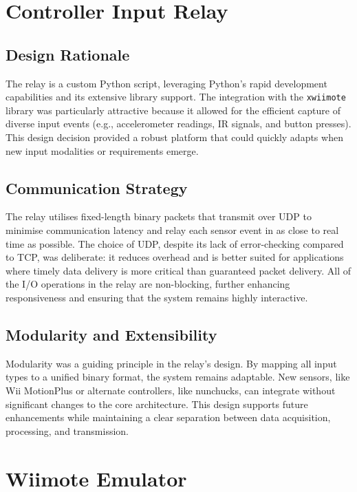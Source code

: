 \section{Controller Input Relay}

\subsection{Design Rationale}
The relay is a custom Python script, leveraging Python’s rapid development capabilities and its extensive library support. The integration with the \texttt{xwiimote} library was particularly attractive because it allowed for the efficient capture of diverse input events (e.g., accelerometer readings, IR signals, and button presses). This design decision provided a robust platform that could quickly adapts when new input modalities or requirements emerge.

\subsection{Communication Strategy}
The relay utilises fixed-length binary packets that transmit over UDP to minimise communication latency and relay each sensor event in as close to real time as possible. The choice of UDP, despite its lack of error-checking compared to TCP\cite{wikipediaTCP}, was deliberate: it reduces overhead and is better suited for applications where timely data delivery is more critical than guaranteed packet delivery. All of the I/O operations in the relay are non-blocking, further enhancing responsiveness and ensuring that the system remains highly interactive.

\subsection{Modularity and Extensibility}
Modularity was a guiding principle in the relay’s design. By mapping all input types to a unified binary format, the system remains adaptable. New sensors, like Wii MotionPlus\cite{wikipediaMotionPlus} or alternate controllers, like nunchucks, can integrate without significant changes to the core architecture. This design supports future enhancements while maintaining a clear separation between data acquisition, processing, and transmission.

\section{Wiimote Emulator}

